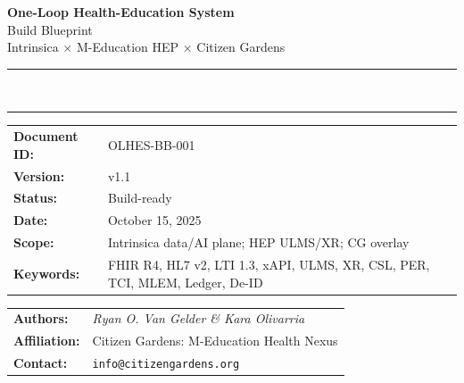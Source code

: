 \documentclass[11pt]{article}
\theoremstyle{plain}
\begin{document}
\begin{titlepage}
  \centering


  \vspace*{1cm}

  {\Large\textbf{One-Loop Health-Education System}}\\[6pt]
  {\large Build Blueprint}\\[10pt]
  {\normalsize Intrinsica \(\times\) M-Education HEP \(\times\) Citizen Gardens}\\[20pt]

  \rule{\textwidth}{0.4pt}\\[-4pt]
  \rule{\textwidth}{1.2pt}

  \vspace{1.2cm}

  \begin{tabular}{>{\bfseries}p{3.2cm} p{10.5cm}}
    Document ID: & OLHES-BB-001 \\
    Version:     & v1.1 \\
    Status:      & Build-ready \\
    Date:        & October 15, 2025 \\
    Scope:       & Intrinsica data/AI plane; HEP ULMS/XR; CG overlay \\
    Keywords:    & FHIR R4, HL7 v2, LTI 1.3, xAPI, ULMS, XR, CSL, PER, TCI, MLEM, Ledger, De-ID \\
  \end{tabular}

  \vfill

  \begin{tabular}{>{\bfseries}p{3.2cm} p{10.5cm}}
    Authors:     & \textit{Ryan O. Van Gelder \& Kara Olivarria} \\
    Affiliation: & Citizen Gardens: M-Education Health Nexus \\
    Contact:     & \texttt{info@citizengardens.org} \\
  \end{tabular}

  \vspace{1.2cm}


\end{titlepage}
\end{document}
